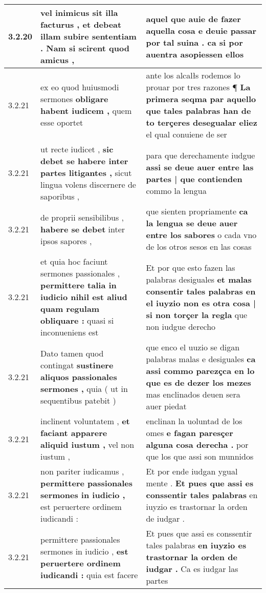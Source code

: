 \begin{tabular}{|p{1cm}|p{6.5cm}|p{6.5cm}|}
3.2.20 & vel inimicus sit illa facturus , \textbf{ et debeat illam subire sententiam . } Nam si scirent quod amicus , & aquel que auie de fazer aquella cosa \textbf{ e deuie passar por tal suina . } ca si por auentra asopiessen ellos \\\hline
3.2.21 & ex eo quod huiusmodi sermones \textbf{ obligare habent iudicem , } quem esse oportet & ante los alcalłs rodemos lo prouar por tres razones ¶ \textbf{ La primera seqma par aquello que tales palabras han de to terçeres desegualar eliez } el qual conuiene de ser \\\hline
3.2.21 & ut recte iudicet , \textbf{ sic debet se habere inter partes litigantes , } sicut lingua volens discernere de saporibus , & para que derechamente iudgue \textbf{ assi se deue auer entre las partes | que contienden } commo la lengua \\\hline
3.2.21 & de proprii sensibilibus , \textbf{ habere se debet } inter ipsos sapores , & que sienten propriamente \textbf{ ca la lengua se deue auer entre los sabores } o cada vno de los otros sesos en las cosas \\\hline
3.2.21 & et quia hoc faciunt sermones passionales , \textbf{ permittere talia in iudicio nihil est aliud quam regulam obliquare : } quasi si inconueniens est & Et por que esto fazen las palabras desiguales \textbf{ et malas consentir tales palabras en el iuyzio non es otra cosa | si non torçer la regla } que non iudgue derecho \\\hline
3.2.21 & Dato tamen quod contingat \textbf{ sustinere aliquos passionales sermones , } quia ( ut in sequentibus patebit ) & que enco el uuzio se digan palabras malas e desiguales \textbf{ ca assi commo parezçca en lo que es de dezer los mezes } mas enclinados deuen sera auer piedat \\\hline
3.2.21 & inclinent voluntatem , \textbf{ et faciant apparere aliquid iustum , } vel non iustum , & enclinan la uoluntad de los omes \textbf{ e fagan paresçer alguna cosa derecha . } por que los que assi son munnidos \\\hline
3.2.21 & non pariter iudicamus , \textbf{ permittere passionales sermones in iudicio , } est peruertere ordinem iudicandi : & Et por ende iudgan ygual mente . \textbf{ Et pues que assi es conssentir tales palabras } en iuyzio es trastornar la orden de iudgar . \\\hline
3.2.21 & permittere passionales sermones in iudicio , \textbf{ est peruertere ordinem iudicandi : } quia est facere & Et pues que assi es conssentir tales palabras \textbf{ en iuyzio es trastornar la orden de iudgar . } Ca es iudgar las partes \\\hline

\end{tabular}
